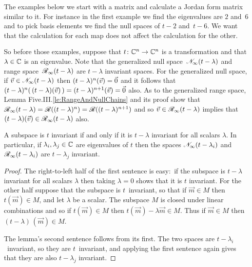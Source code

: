 The examples below we start with a matrix and calculate 
a Jordan form matrix similar to it.
For instance in the first example we find the eigenvalues are $2$ 
and~$6$ and to pick basis elements we find the null spaces of $t-2$ and~$t-6$. 
We want that the calculation for each map does not affect the calculation
for the other.

So before those examples, 
suppose that $\mbox{$t\colon \mathbb{C}^n\to \mathbb{C}^n$}$ is a transformation and 
that $\lambda\in\mathbb{C}$ is an eigenvalue.
Note that the generalized null space~$\mathscr{N}_\infty(t-\lambda)$ 
and range space~$\mathscr{R}_\infty(t-\lambda)$ are $t-\lambda$
invariant spaces.
For the generalized null space, 
if $\vec{v}\in\mathscr{N}_\infty(t-\lambda)$ then 
$(t-\lambda)^n(\vec{v})=\vec{0}$ and it follows that
$(t-\lambda)^n(\,(t-\lambda)(\vec{v})\,)=(t-\lambda)^{n+1}(\vec{v})=\vec{0}$ 
also. 
As to the generalized range space,
Lemma Five.III.\ref{le:RangeAndNullChains} and its proof show that
$\mathscr{R}_\infty(t-\lambda)
  =\mathscr{R}((t-\lambda)^n)
  =\mathscr{R}((t-\lambda)^{n+1})$ 
and so $\vec{v}\in\mathscr{R}_\infty(t-\lambda)$ implies that
$(t-\lambda)(\vec{v})\in\mathscr{R}_\infty(t-\lambda)$ also.

\begin{lemma} \label{le:tInvIfftMinLambdaInv}
A subspace is \( t \) invariant if and only if 
it is \( t-\lambda \) invariant for all scalars \( \lambda \).
In particular, 
if \( \lambda_i,\lambda_j\in\mathbb{C} \) are eigenvalues of
\( t \) then
the spaces \( \mathscr{N}_\infty(t-\lambda_i) \) 
and \( \mathscr{R}_\infty(t-\lambda_i) \)
are \( t-\lambda_j \) invariant.
\end{lemma}

\begin{proof}
The right-to-left half of the first sentence is easy:~if 
the subspace is $t-\lambda$ invariant for 
all scalars $\lambda$ then taking $\lambda=0$ 
shows that it is $t$ invariant.
For the other half suppose that the subspace is $t$~invariant,
so that if $\vec{m}\in M$ then $t(\vec{m})\in M$, and let $\lambda$ be 
a scalar.
The subspace $M$ is closed under linear combinations and so if 
$t(\vec{m})\in M$ then $t(\vec{m})-\lambda\vec{m}\in M$.
Thus if $\vec{m}\in M$ then $(t-\lambda)\,(\vec{m})\in M$.

The lemma's second sentence follows from its first.
The
two spaces are $t-\lambda_i$~invariant, so they are \( t \)~invariant,
and applying the first sentence again gives that 
they are also \( t-\lambda_j \) invariant.
\end{proof}

